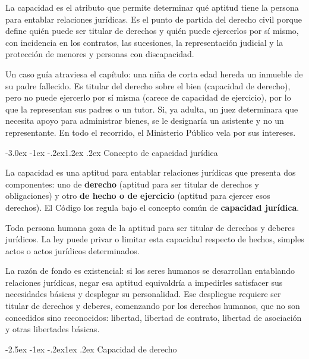 \documentclass[12pt,oneside]{book}
\makeatletter
\renewcommand\section{\@startsection{section}{1}{\z@}%
  {-3.0ex \@plus -1ex \@minus -.2ex}{1.2ex \@plus .2ex}%
  {\normalfont\large\bfseries\color{acento}}}
\renewcommand\subsection{\@startsection{subsection}{2}{\z@}%
  {-2.5ex \@plus -1ex \@minus -.2ex}{1ex \@plus .2ex}%
  {\normalfont\normalsize\bfseries}}
\makeatother
\begin{document}
La capacidad es el atributo que permite determinar qué aptitud tiene la persona para entablar relaciones jurídicas. Es el punto de partida del derecho civil porque define quién puede ser titular de derechos y quién puede ejercerlos por sí mismo, con incidencia en los contratos, las sucesiones, la representación judicial y la protección de menores y personas con discapacidad.

Un caso guía atraviesa el capítulo: una niña de corta edad hereda un inmueble de su padre fallecido. Es titular del derecho sobre el bien (capacidad de derecho), pero no puede ejercerlo por sí misma (carece de capacidad de ejercicio), por lo que la representan sus padres o un tutor. Si, ya adulta, un juez determinara que necesita apoyo para administrar bienes, se le designaría un asistente y no un representante. En todo el recorrido, el Ministerio Público vela por sus intereses.

\section{Concepto de capacidad jurídica}

La capacidad es una aptitud para entablar relaciones jurídicas que presenta dos componentes: uno de \textbf{derecho} (aptitud para ser titular de derechos y obligaciones) y otro \textbf{de hecho o de ejercicio} (aptitud para ejercer esos derechos). El Código los regula bajo el concepto común de \textbf{capacidad jurídica}.

\begin{regla}
Toda persona humana goza de la aptitud para ser titular de derechos y deberes jurídicos. La ley puede privar o limitar esta capacidad respecto de hechos, simples actos o actos jurídicos determinados.
\end{regla}

La razón de fondo es existencial: si los seres humanos se desarrollan entablando relaciones jurídicas, negar esa aptitud equivaldría a impedirles satisfacer sus necesidades básicas y desplegar su personalidad. Ese despliegue requiere ser titular de derechos y deberes, comenzando por los derechos humanos, que no son concedidos sino reconocidos: libertad, libertad de contrato, libertad de asociación y otras libertades básicas.

\subsection{Capacidad de derecho}
\end{document}

